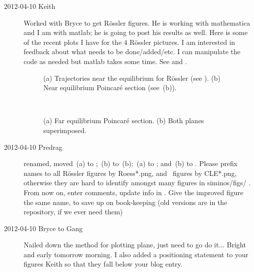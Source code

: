 \begin{description}
\item[2012-04-10 Keith] Worked with Bryce to get R\"ossler figures.  He
is working with mathematica and I am with matlab; he is going to post his
results as well.  Here is some of the recent plots I have for the 4
R\"ossler pictures.  I am interested in feedback about what needs to be
done/added/etc.  I can manipulate the code as needed but matlab takes
some time.  See  and .

 \begin{figure}[H]
 \begin{center}
 \end{center}
 \caption{\label{fig:neareq}
(a)
Trajectories near the equilibrium for R\"ossler
(see ).
(b)
Near equilibrium Poincar\'e section
(see \,(b)).
    }
 \end{figure}

 \begin{figure}[H]
 \begin{center}
~~~~~~~~
 \end{center}
 \caption{\label{fig:twoplane}
(a)
Far equilibrium Poincar\'e section.
(b)
Both planes superimposed.
    }
 \end{figure}


\item[2012-04-10  Predrag] renamed, moved
\,(a) to ;
\,(b) to \,(b);
\,(a) to  ; and
\,(b) to  .
Please prefix names to all R\"ossler figures by Roess*.png, and \cLe\ figures
by CLE*.png, otherwise they are hard to identify amongst many figures in
siminos/figs/ . From now on, enter comments, update info in
. Give the improved figure the same name, to save up
on book-keeping (old versions are in the repository, if we ever need
them)

\item[2012-04-10 Bryce to Gang]
Nailed down the method for plotting plane, just need to go do it...
Bright and early tomorrow morning. I also added a positioning statement
to your figures Keith so that they fall below your blog entry.



\end{description}
